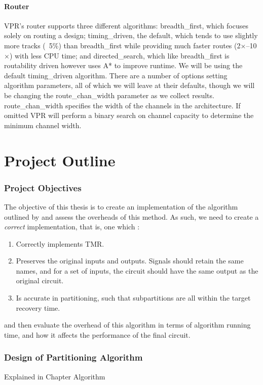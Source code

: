 \documentclass[12pt,final,oneside]{dwThesis} %
\begin{document}
   \subsubsection{Router}
   \gls{VPR}'s router supports three different algorithms: breadth\_first, which focuses solely on routing a design; timing\_driven, the default, which tends to use slightly more tracks (~5\%) than breadth\_first while providing much faster routes (2$\times$--10$\times$) with less CPU time; and directed\_search, which like breadth\_first is routability driven however uses A* to improve runtime. We will be using the default timing\_driven algorithm.
   There are a number of options setting algorithm parameters, all of which we will leave at their defaults, though we will be changing the route\_chan\_width parameter as we collect results. route\_chan\_width specifies the width of the channels in the architecture. If omitted \gls{VPR} will perform a binary search on channel capacity to determine the minimum channel width.

\chapter{Project Outline}
	\subsection{Project Objectives}\label{secObjectives}
		The objective of this thesis is to create an implementation of the algorithm outlined by \cite{DiesselChange} and assess the overheads of this method.
		As such, we need to create a \textit{correct} implementation, that is, one which :\begin{enumerate}
			\item Correctly implements TMR.
			\item Preserves the original inputs and outputs. Signals should retain the same names, and for a set of inputs, the circuit should have the same output as the original circuit.
			\item Is accurate in partitioning, such that subpartitions are all within the target recovery time.
\end{enumerate} and then evaluate the overhead of this algorithm in terms of algorithm running time, and how it affects the performance of the final circuit.
	\subsection{Design of Partitioning Algorithm}
		Explained in Chapter Algorithm
\end{document}
